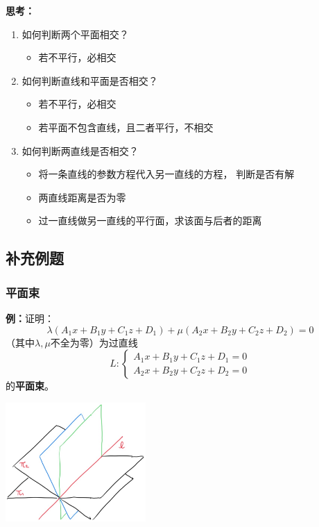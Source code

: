 {\bf 思考：}
\begin{enumerate}[(1)]
  \setlength{\itemindent}{1cm}
  \item 如何判断两个平面相交？
  \begin{itemize}
    \item 若不平行，必相交
  \end{itemize}
  \item 如何判断直线和平面是否相交？
  \begin{itemize}
    \item 若不平行，必相交
    \item 若平面不包含直线，且二者平行，不相交
  \end{itemize}
  \item 如何判断两直线是否相交？
  \begin{itemize}
    \item 将一条直线的参数方程代入另一直线的方程，
    判断是否有解
    \item 两直线距离是否为零
    \item 过一直线做另一直线的平行面，求该面与后者的距离
  \end{itemize}
\end{enumerate}

\subsection{补充例题}

\subsubsection{平面束}

{\bf 例：}证明：$$\lambda(A_1x+B_1y+C_1z+D_1)+\mu(A_2x+B_2y+C_2z+D_2)=0$$
（其中$\lambda,\mu$不全为零）为过直线
$$L:\left\{\begin{array}{l}
	A_1x+B_1y+C_1z+D_1=0\\
	A_2x+B_2y+C_2z+D_2=0
\end{array}\right.$$
的{\bf 平面束}。

\begin{center}
	\includegraphics[width=0.4\textwidth]{./images/ch8/pss.jpg}
\end{center}

